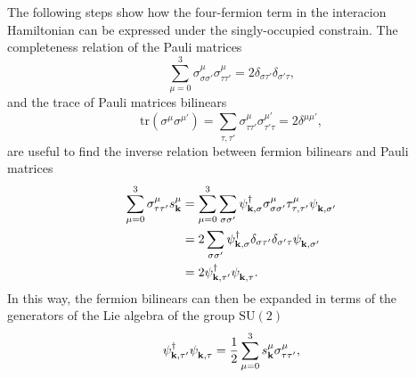 \documentclass[english,aps,prd,nofootinbib,twocolumn]{revtex4-1}
\begin{document}
The following steps show how the four-fermion term in the interacion Hamiltonian can be expressed under the singly-occupied constrain. The completeness relation of the Pauli matrices
\begin{equation}
\sum_{\mu=0}^{3} 
\sigma^{\mu }_{\sigma \sigma'}\sigma^{\mu }_{\tau \tau'} =  
2 \delta_{\sigma \tau'} \delta_{\sigma'\tau },
\end{equation}
and the trace of Pauli matrices bilinears 
\begin{equation}
\mathrm{tr}\left( \sigma^{\mu }\sigma^{\mu'} \right) = 
\sum_{\tau ,\tau'}
\sigma^{\mu }_{\tau \tau'}\sigma^{\mu'}_{\tau'\tau } = 
2 \delta^{\mu \mu'},
\end{equation}
are useful to find the inverse relation between fermion bilinears and Pauli matrices
\begin{equation}
\begin{split}
\sum_{\mu=0}^{3} 
\sigma^{\mu }_{\tau \tau'}s^{\mu}_{\mathbf{k }} &= 
\sum_{\mu=0}^{3} \sum_{\sigma \sigma'} 
\psi_{\mathbf{k ,\sigma }}^{\textcolor{black}{\dagger}}
\sigma^{\mu }_{\sigma \sigma'}\tau^{\mu }_{\tau ,\tau'}
\psi_{\mathbf{k ,\sigma'}}^{\textcolor{white}{\dagger}} \\ &= 
2
\sum_{\sigma \sigma'} 
\psi_{\mathbf{k ,\sigma }}^{\textcolor{black}{\dagger}}
\delta_{\sigma \tau'} \delta_{\sigma'\tau }
\psi_{\mathbf{k ,\sigma'}}^{\textcolor{white}{\dagger}} \\ &= 
2
\psi_{\mathbf{k ,\tau'}}^{\textcolor{black}{\dagger}}
\psi_{\mathbf{k ,\tau }}^{\textcolor{white}{\dagger}} .
\end{split}
\end{equation}
In this way, the fermion bilinears can then be expanded in terms of the generators of the Lie algebra of the group $\mathrm{SU}(2)$
\begin{equation}
\label{eq:SU(2)-expansion-of-fermion-bilinears}
\psi_{\mathbf{k ,\tau'}}^{\textcolor{black}{\dagger}}
\psi_{\mathbf{k ,\tau }}^{\textcolor{white}{\dagger}} = 
\frac{1}{2}
\sum_{\mu=0}^{3} 
s^{\mu }_{\mathbf{k }}\sigma^{\mu }_{\tau \tau'},
\end{equation}
\end{document}
